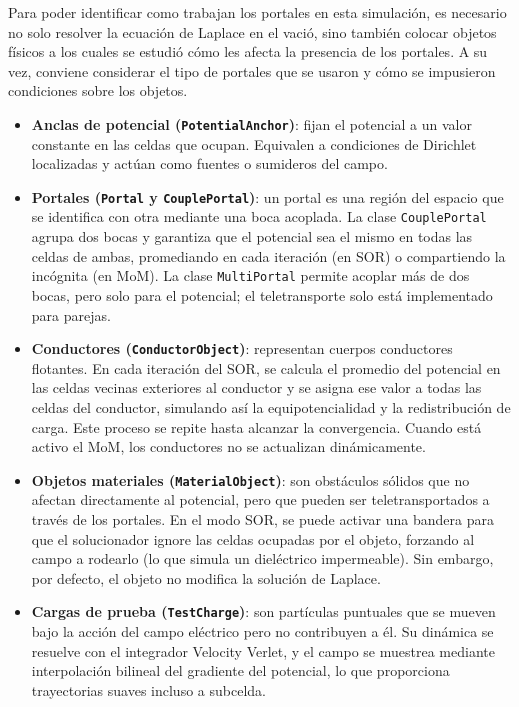 \documentclass[12pt, twocolumn]{article}
\begin{document}
Para poder identificar como trabajan los portales en esta simulación, es necesario no solo resolver la ecuación de Laplace en el vació, sino también colocar objetos físicos a los cuales se estudió cómo les afecta la presencia de los portales. A su vez, conviene considerar el tipo de portales que se usaron y cómo se impusieron condiciones sobre los objetos.

\begin{itemize}
    \item \textbf{Anclas de potencial (\texttt{PotentialAnchor})}: fijan el potencial a un valor constante en las celdas que ocupan. Equivalen a condiciones de Dirichlet localizadas y actúan como fuentes o sumideros del campo.
    
    \item \textbf{Portales (\texttt{Portal} y \texttt{CouplePortal})}: un portal es una región del espacio que se identifica con otra mediante una boca acoplada. La clase \texttt{CouplePortal} agrupa dos bocas y garantiza que el potencial sea el mismo en todas las celdas de ambas, promediando en cada iteración (en SOR) o compartiendo la incógnita (en MoM). La clase \texttt{MultiPortal} permite acoplar más de dos bocas, pero solo para el potencial; el teletransporte solo está implementado para parejas.
    
    \item \textbf{Conductores (\texttt{ConductorObject})}: representan cuerpos conductores flotantes. En cada iteración del SOR, se calcula el promedio del potencial en las celdas vecinas exteriores al conductor y se asigna ese valor a todas las celdas del conductor, simulando así la equipotencialidad y la redistribución de carga. Este proceso se repite hasta alcanzar la convergencia. Cuando está activo el MoM, los conductores no se actualizan dinámicamente.
    
    \item \textbf{Objetos materiales (\texttt{MaterialObject})}: son obstáculos sólidos que no afectan directamente al potencial, pero que pueden ser teletransportados a través de los portales. En el modo SOR, se puede activar una bandera para que el solucionador ignore las celdas ocupadas por el objeto, forzando al campo a rodearlo (lo que simula un dieléctrico impermeable). Sin embargo, por defecto, el objeto no modifica la solución de Laplace.
    
    \item \textbf{Cargas de prueba (\texttt{TestCharge})}: son partículas puntuales que se mueven bajo la acción del campo eléctrico pero no contribuyen a él. Su dinámica se resuelve con el integrador Velocity Verlet, y el campo se muestrea mediante interpolación bilineal del gradiente del potencial, lo que proporciona trayectorias suaves incluso a subcelda.
\end{itemize}
\end{document}
